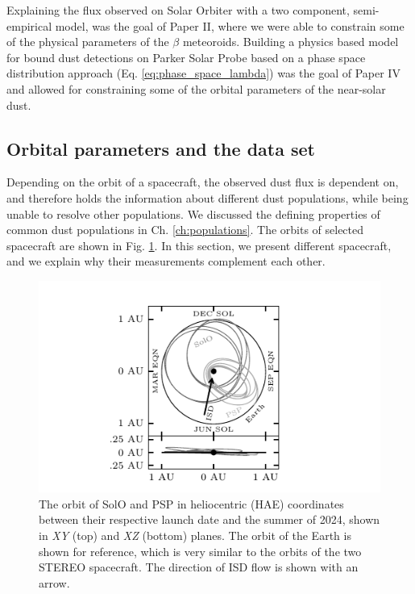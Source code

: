 Explaining the flux observed on Solar Orbiter with a two component, semi-empirical model, was the goal of Paper II, where we were able to constrain some of the physical parameters of the $\beta$ meteoroids. Building a physics based model for bound dust detections on Parker Solar Probe based on a phase space distribution approach (Eq. \ref{eq:phase_space_lambda}) was the goal of Paper IV and allowed for constraining some of the orbital parameters of the near-solar dust. 

\subsection{Orbital parameters and the data set}

Depending on the orbit of a spacecraft, the observed dust flux is dependent on, and therefore holds the information about different dust populations, while being unable to resolve other populations. We discussed the defining properties of common dust populations in Ch. \ref{ch:populations}. The orbits of selected spacecraft are shown in Fig. \ref{fig:sc_orbits}. In this section, we present different spacecraft, and we explain why their measurements complement each other.  

\begin{figure}[h]
 	\centering
 	\includegraphics[width=14cm]{figures/solo_orbit.pdf}
 	\caption{The orbit of SolO and PSP in heliocentric (HAE) coordinates between their respective launch date and the summer of 2024, shown in \textit{XY} (top) and \textit{XZ} (bottom) planes. The orbit of the Earth is shown for reference, which is very similar to the orbits of the two STEREO spacecraft. The direction of ISD flow is shown with an arrow.}
 	\label{fig:sc_orbits}
\end{figure}

